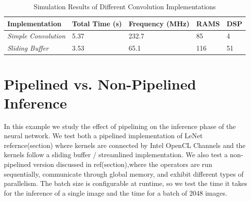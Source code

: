 \begin{table}[]
\begin{tabular}{|l|l|l|l|l|}
\hline
\textbf{Implementation}     & \textbf{Total Time (s)} & \textbf{Frequency (MHz)} & \textbf{RAMS} & \textbf{DSP} \\ \hline
\textit{Simple Convolution} & 5.37                    & 232.7                    & 85            & 4            \\ \hline
\textit{Sliding Buffer}     & 3.53                    & 65.1                     & 116           & 51           \\ \hline
\end{tabular}
\label{tab:resultp2}
\caption{Simulation Results of Different Convolution Implementations }
\end{table}


\section{Pipelined vs. Non-Pipelined Inference}

In this example we study the effect of pipelining on the inference phase of the neural network. We test both a pipelined implementation of LeNet refernce(section) where kernels are connected by Intel OpenCL Channels and the kernels follow a sliding buffer / streamlined implementation. We also test a non-pipelined version discussed in ref(section),where the operators are run sequentially, communicate through global memory, and exhibit different types of parallelism. The batch size is configurable at runtime, so we test the time it takes for the inference of a single image and the time for a batch of 2048 images. 

